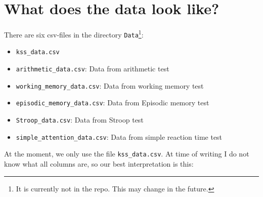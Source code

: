\documentclass[10pt, twoside,a4paper]{article}
\begin{document}
\section{What does the data look like?}
There are six csv-files in the directory \verb+Data+\footnote{It is currently not in the repo. This may change in the future.}:
\begin{itemize}
\item \verb+kss_data.csv+
\item \verb+arithmetic_data.csv+: Data from arithmetic test
\item \verb+working_memory_data.csv+: Data from working memory test
\item \verb+episodic_memory_data.csv+: Data from Episodic memory test
\item \verb+Stroop_data.csv+: Data from Stroop test
\item \verb+simple_attention_data.csv+: Data from simple reaction time test
\end{itemize}
At the moment, we only use the file \verb+kss_data.csv+. At time of writing I do not know what all columns are, so our best interpretation is this:
\end{document}
